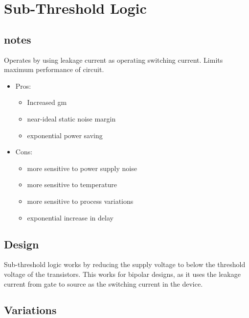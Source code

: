 \section{Sub-Threshold Logic}
\label{sec:subthresh}



\subsection{notes}

Operates by using leakage current as operating switching current.
Limits maximum performance of circuit.

\begin{itemize}

\item{Pros:}

\begin{itemize}

\item{Increased gm}
\item{near-ideal static noise margin}
\item{exponential power saving}

\end{itemize}

\item{Cons:}

\begin{itemize}

\item{more sensitive to power supply noise}
\item{more sensitive to temperature}
\item{more sensitive to process variations}
\item{exponential increase in delay}

\end{itemize}

\end{itemize}

\subsection{Design}
Sub-threshold logic works by reducing the supply voltage to below the threshold voltage of the transistors.
This works for bipolar designs, as it uses the leakage current from gate to source as the switching current in the device.

\subsection{Variations}
